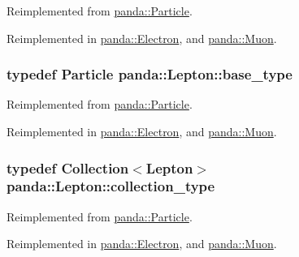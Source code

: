 Reimplemented from \hyperlink{classpanda_1_1Particle_ac7774202a46a6e99815ebbda009cdeff}{panda::Particle}.

Reimplemented in \hyperlink{classpanda_1_1Electron_a7bfeb05c19bc521a2e12e1704cc16958}{panda::Electron}, and \hyperlink{classpanda_1_1Muon_a03903de481ebc3c6db1d7d979ba99691}{panda::Muon}.\hypertarget{classpanda_1_1Lepton_ab8f2fc84ff093d5200d1905677d15578}{
\subsubsection[{base\_\-type}]{\setlength{\rightskip}{0pt plus 5cm}typedef {\bf Particle} {\bf panda::Lepton::base\_\-type}}}
\label{classpanda_1_1Lepton_ab8f2fc84ff093d5200d1905677d15578}


Reimplemented from \hyperlink{classpanda_1_1Particle_a0055c0e7a7015a0446f6c4f8e6f1d469}{panda::Particle}.

Reimplemented in \hyperlink{classpanda_1_1Electron_a0fdcdc003b2db72940f10d648b3833a6}{panda::Electron}, and \hyperlink{classpanda_1_1Muon_a071b288ec091c14f1fe42db77ef7821e}{panda::Muon}.\hypertarget{classpanda_1_1Lepton_acba098c3047ecbfa9c1ad6c88a3ba95f}{
\subsubsection[{collection\_\-type}]{\setlength{\rightskip}{0pt plus 5cm}typedef {\bf Collection}$<${\bf Lepton}$>$ {\bf panda::Lepton::collection\_\-type}}}
\label{classpanda_1_1Lepton_acba098c3047ecbfa9c1ad6c88a3ba95f}


Reimplemented from \hyperlink{classpanda_1_1Particle_a5c7d779f6db770bcc94cfe63c42b59d2}{panda::Particle}.

Reimplemented in \hyperlink{classpanda_1_1Electron_abf729472e92b96747fc90029ca7ac3a1}{panda::Electron}, and \hyperlink{classpanda_1_1Muon_a74e005c403745217b3e67bd6709ccea3}{panda::Muon}.

